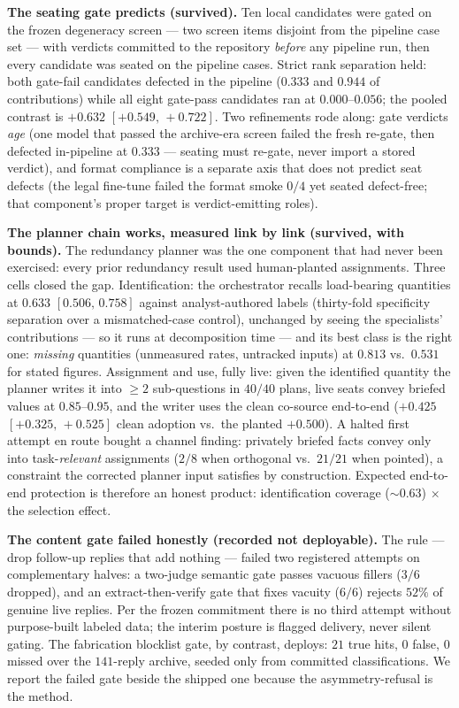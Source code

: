 \documentclass[11pt]{article}
\newcommand{\ci}[2]{\ensuremath{[#1,\,#2]}}
\begin{document}
\textbf{The seating gate predicts (survived).} Ten local candidates
were gated on the frozen degeneracy screen --- two screen items
disjoint from the pipeline case set --- with verdicts committed to the
repository \emph{before} any pipeline run, then every candidate was
seated on the pipeline cases. Strict rank separation held: both
gate-fail candidates defected in the pipeline ($0.333$ and $0.944$ of
contributions) while all eight gate-pass candidates ran at
$0.000$--$0.056$; the pooled contrast is $+0.632$ \ci{+0.549}{+0.722}.
Two refinements rode along: gate verdicts \emph{age} (one model that
passed the archive-era screen failed the fresh re-gate, then defected
in-pipeline at $0.333$ --- seating must re-gate, never import a stored
verdict), and format compliance is a separate axis that does not
predict seat defects (the legal fine-tune failed the format smoke $0/4$
yet seated defect-free; that component's proper target is
verdict-emitting roles).

\textbf{The planner chain works, measured link by link (survived,
with bounds).} The redundancy planner was the one component that had
never been exercised: every prior redundancy result used human-planted
assignments. Three cells closed the gap. Identification: the
orchestrator recalls load-bearing quantities at $0.633$
\ci{0.506}{0.758} against analyst-authored labels (thirty-fold
specificity separation over a mismatched-case control), unchanged by
seeing the specialists' contributions --- so it runs at decomposition
time --- and its best class is the right one: \emph{missing} quantities
(unmeasured rates, untracked inputs) at $0.813$ vs.\ $0.531$ for
stated figures. Assignment and use, fully live: given the identified
quantity the planner writes it into ${\ge}2$ sub-questions in $40/40$
plans, live seats convey briefed values at $0.85$--$0.95$, and the
writer uses the clean co-source end-to-end ($+0.425$
\ci{+0.325}{+0.525} clean adoption vs.\ the planted $+0.500$). A
halted first attempt en route bought a channel finding: privately
briefed facts convey only into task-\emph{relevant} assignments
($2/8$ when orthogonal vs.\ $21/21$ when pointed), a constraint the
corrected planner input satisfies by construction. Expected end-to-end
protection is therefore an honest product: identification coverage
(${\sim}0.63$) $\times$ the selection effect.

\textbf{The content gate failed honestly (recorded not deployable).}
The rule --- drop follow-up replies that add nothing --- failed two
registered attempts on complementary halves: a two-judge semantic gate
passes vacuous fillers ($3/6$ dropped), and an extract-then-verify
gate that fixes vacuity ($6/6$) rejects $52\%$ of genuine live
replies. Per the frozen commitment there is no third attempt without
purpose-built labeled data; the interim posture is flagged delivery,
never silent gating. The fabrication blocklist gate, by contrast,
deploys: $21$ true hits, $0$ false, $0$ missed over the $141$-reply
archive, seeded only from committed classifications. We report the
failed gate beside the shipped one because the asymmetry-refusal is
the method.
\end{document}
